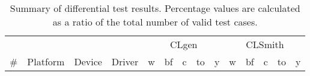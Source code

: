 \begin{table*}[t!]
  \scriptsize %
  \centering %
  \begin{tabular}{llll | rrrrr | rrrrr}
    \toprule
     & & & & \multicolumn{5}{|c|}{CLgen} & \multicolumn{5}{|c|}{CLSmith} \\
    \# & Platform & Device & Driver & w & bf & c & to & y & w & bf & c & to & y \\
    \midrule

    \bottomrule
  \end{tabular}
  \caption{Summary of differential test results. Percentage values are calculated as a ratio of the total number of valid test cases. }
  \label{tab:results}
\end{table*}
